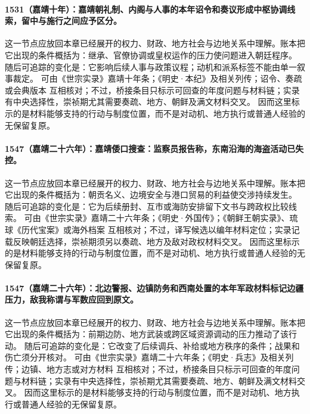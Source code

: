 \paragraph{1531（嘉靖十年）：嘉靖朝礼制、内阁与人事的本年诏令和奏议形成中枢协调线索，留中与施行之间应予区分。} 这一节点应放回本章已经展开的权力、财政、地方社会与边地关系中理解。账本把它出现的条件概括为：继承、官僚协调或皇权运作的压力使问题进入朝廷程序。 随后可追踪的变化是：它影响后续人事与政策议程；动机和派系标签不能由单一叙事裁定。 可由《世宗实录》嘉靖十年条；《明史·本纪》及相关列传；诏令、奏疏或会典版本 互相核对；不过，桥接条目只标示可回查的年度问题与材料链；实录有中央选择性，崇祯期尤其需要奏疏、地方、朝鲜及满文材料交叉。 因而这里标示的是材料能够支持的行动与制度位置，而不是对动机、地方执行或普通人经验的无保留复原。

\paragraph{1547（嘉靖二十六年）：嘉靖倭口搜查：监察员报告称，东南沿海的海盗活动已失控。} 这一节点应放回本章已经展开的权力、财政、地方社会与边地关系中理解。账本把它出现的条件概括为：朝贡名义、边境安全与港口贸易的利益使交涉持续发生。 随后可追踪的变化是：它为后续册封、互市或海防安排留下文书与跨政权比较线索。 可由《世宗实录》嘉靖二十六年条；《明史·外国传》；《朝鲜王朝实录》、琉球《历代宝案》或海外档案 互相核对；不过，译写候选以编年材料定位；实录记载反映朝廷选择，崇祯期须另以奏疏、地方及敌对政权材料交叉。 因而这里标示的是材料能够支持的行动与制度位置，而不是对动机、地方执行或普通人经验的无保留复原。

\paragraph{1547（嘉靖二十六年）：北边警报、边镇防务和西南处置的本年军政材料标记边疆压力，敌我称谓与军数应回到原文。} 这一节点应放回本章已经展开的权力、财政、地方社会与边地关系中理解。账本把它出现的条件概括为：前期边防、地方武装或跨区域资源调动的压力推动了该行动。 随后可追踪的变化是：它改变了后续调兵、补给或地方秩序的条件；战果和伤亡须分开核对。 可由《世宗实录》嘉靖二十六年条；《明史·兵志》及相关列传；边镇、地方志或对方材料 互相核对；不过，桥接条目只标示可回查的年度问题与材料链；实录有中央选择性，崇祯期尤其需要奏疏、地方、朝鲜及满文材料交叉。 因而这里标示的是材料能够支持的行动与制度位置，而不是对动机、地方执行或普通人经验的无保留复原。

